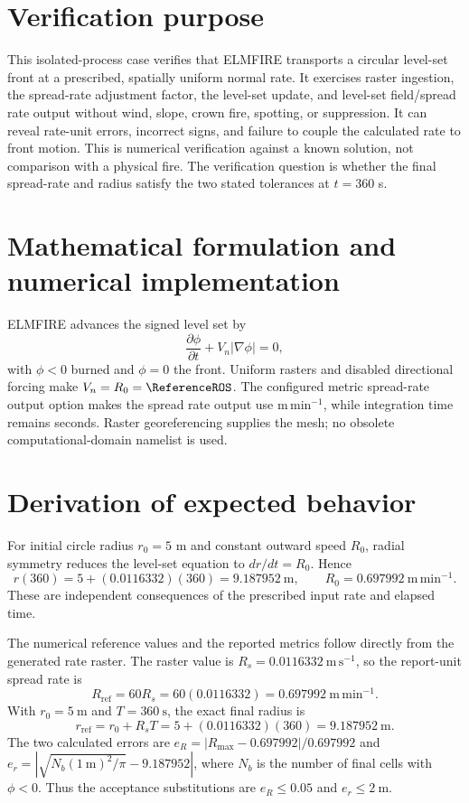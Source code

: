 \section{Verification purpose}

This isolated-process case verifies that ELMFIRE transports a circular level-set front at a prescribed, spatially uniform normal rate. It exercises raster ingestion, the spread-rate adjustment factor, the level-set update, and level-set field/spread rate output without wind, slope, crown fire, spotting, or suppression. It can reveal rate-unit errors, incorrect signs, and failure to couple the calculated rate to front motion. This is numerical verification against a known solution, not comparison with a physical fire. The verification question is whether the final spread-rate and radius satisfy the two stated tolerances at \(t=360\) s.

\section{Mathematical formulation and numerical implementation}

ELMFIRE advances the signed level set by
\[
 \frac{\partial\phi}{\partial t}+V_n|\nabla\phi|=0,
\]
with \(\phi<0\) burned and \(\phi=0\) the front. Uniform rasters and disabled directional forcing make \(V_n=R_0=\ReferenceROS\). The configured metric spread-rate output option makes the spread rate output use \(\mathrm{m\,min^{-1}}\), while integration time remains seconds. Raster georeferencing supplies the mesh; no obsolete computational-domain namelist is used.

\section{Derivation of expected behavior}

For initial circle radius \(r_0=5\) m and constant outward speed \(R_0\), radial symmetry reduces the level-set equation to \(dr/dt=R_0\). Hence
\[
 r(360)=5+(0.0116332)(360)=9.187952~\mathrm{m},
 \qquad R_0=0.697992~\mathrm{m\,min^{-1}}.
\]
These are independent consequences of the prescribed input rate and elapsed time.

The numerical reference values and the reported metrics follow directly from the generated rate raster.  The raster value is \(R_s=0.0116332~\mathrm{m\,s^{-1}}\), so the report-unit spread rate is
\[
 R_{\mathrm{ref}}=60R_s=60(0.0116332)=0.697992~\mathrm{m\,min^{-1}}.
\]
With \(r_0=5~\mathrm{m}\) and \(T=360~\mathrm{s}\), the exact final radius is
\[
 r_{\mathrm{ref}}=r_0+R_sT=5+(0.0116332)(360)=9.187952~\mathrm{m}.
\]
The two calculated errors are \(e_R=|R_{\max}-0.697992|/0.697992\) and
\(e_r=|\sqrt{N_b(1~\mathrm{m})^2/\pi}-9.187952|\), where \(N_b\) is the
number of final cells with \(\phi<0\).  Thus the acceptance substitutions are
\(e_R\leq0.05\) and \(e_r\leq2~\mathrm{m}\).

